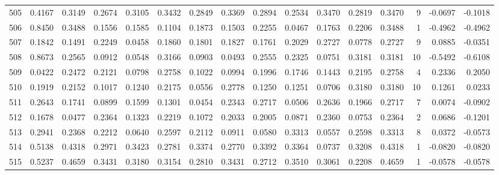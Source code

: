 \begin{tabular}{lrrrrrrrrrrrrrrr}
505 &      0.4167 &  0.3149 &  0.2674 &  0.3105 &  0.3432 &  0.2849 &  0.3369 &  0.2894 &  0.2534 &  0.3470 &   0.2819 &     0.3470 &      9 &                   -0.0697 &                    -0.1018 \\
506 &      0.8450 &  0.3488 &  0.1556 &  0.1585 &  0.1104 &  0.1873 &  0.1503 &  0.2255 &  0.0467 &  0.1763 &   0.2206 &     0.3488 &      1 &                   -0.4962 &                    -0.4962 \\
507 &      0.1842 &  0.1491 &  0.2249 &  0.0458 &  0.1860 &  0.1801 &  0.1827 &  0.1761 &  0.2029 &  0.2727 &   0.0778 &     0.2727 &      9 &                    0.0885 &                    -0.0351 \\
508 &      0.8673 &  0.2565 &  0.0912 &  0.0548 &  0.3166 &  0.0903 &  0.0493 &  0.2555 &  0.2325 &  0.0751 &   0.3181 &     0.3181 &     10 &                   -0.5492 &                    -0.6108 \\
509 &      0.0422 &  0.2472 &  0.2121 &  0.0798 &  0.2758 &  0.1022 &  0.0994 &  0.1996 &  0.1746 &  0.1443 &   0.2195 &     0.2758 &      4 &                    0.2336 &                     0.2050 \\
510 &      0.1919 &  0.2152 &  0.1017 &  0.1240 &  0.2175 &  0.0556 &  0.2778 &  0.1250 &  0.1251 &  0.0706 &   0.3180 &     0.3180 &     10 &                    0.1261 &                     0.0233 \\
511 &      0.2643 &  0.1741 &  0.0899 &  0.1599 &  0.1301 &  0.0454 &  0.2343 &  0.2717 &  0.0506 &  0.2636 &   0.1966 &     0.2717 &      7 &                    0.0074 &                    -0.0902 \\
512 &      0.1678 &  0.0477 &  0.2364 &  0.1323 &  0.2219 &  0.1072 &  0.2033 &  0.2005 &  0.0871 &  0.2360 &   0.0753 &     0.2364 &      2 &                    0.0686 &                    -0.1201 \\
513 &      0.2941 &  0.2368 &  0.2212 &  0.0640 &  0.2597 &  0.2112 &  0.0911 &  0.0580 &  0.3313 &  0.0557 &   0.2598 &     0.3313 &      8 &                    0.0372 &                    -0.0573 \\
514 &      0.5138 &  0.4318 &  0.2971 &  0.3423 &  0.2781 &  0.3374 &  0.2770 &  0.3392 &  0.3364 &  0.0737 &   0.3208 &     0.4318 &      1 &                   -0.0820 &                    -0.0820 \\
515 &      0.5237 &  0.4659 &  0.3431 &  0.3180 &  0.3154 &  0.2810 &  0.3431 &  0.2712 &  0.3510 &  0.3061 &   0.2208 &     0.4659 &      1 &                   -0.0578 &                    -0.0578 \\

\end{tabular}

